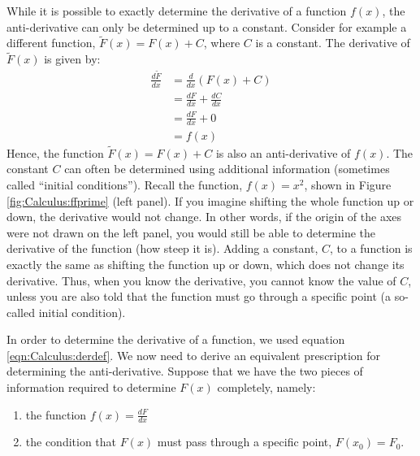 While it is possible to exactly determine the derivative of a function $f(x)$, the anti-derivative can only be determined up to a constant. Consider for example a different function, $\tilde F(x)=F(x)+C$, where $C$ is a constant. The derivative of $\tilde F(x)$ is given by:
\begin{align*}
\frac{d\tilde{F}}{dx}&=\frac{d}{dx}\left(F(x)+C\right)\\
&=\frac{dF}{dx}+\frac{dC}{dx}\\
&=\frac{dF}{dx}+0\\
&=f(x)
\end{align*}
Hence, the function $\tilde F(x)=F(x)+C$ is also an anti-derivative of $f(x)$. The constant $C$ can often be determined using additional information (sometimes called ``initial conditions''). Recall the function, $f(x)=x^2$, shown in Figure \ref{fig:Calculus:ffprime} (left panel). If you imagine shifting the whole function up or down, the derivative would not change. In other words, if the origin of the axes were not drawn on the left panel, you would still be able to determine the derivative of the function (how steep it is). Adding a constant, $C$, to a function is exactly the same as shifting the function up or down, which does not change its derivative. Thus, when you know the derivative, you cannot know the value of $C$, unless you are also told that the function must go through a specific point (a so-called initial condition).

In order to determine the derivative of a function, we used equation \ref{eqn:Calculus:derdef}. We now need to derive an equivalent prescription for determining the anti-derivative. Suppose that we have the two pieces of information required to determine $F(x)$ completely, namely:
\begin{enumerate}
\item the function $f(x)=\frac{dF}{dx}$
\item the condition that $F(x)$ must pass through a specific point, $F(x_0)=F_0$.
\end{enumerate}

